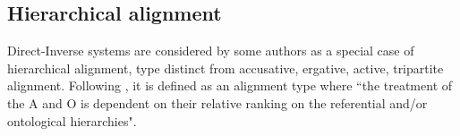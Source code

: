 \documentclass[twoside,a4paper,11pt]{article}
\begin{document}

\subsection{Hierarchical alignment}
Direct-Inverse systems are considered by some authors as a special case of hierarchical alignment,   type distinct from accusative, ergative, active, tripartite alignment. Following  \citet[10]{siewierska98person}, it is defined as an alignment type where ``the treatment of the A and O is dependent on their relative ranking on the referential and/or ontological hierarchies".





%
 



\end{document}
